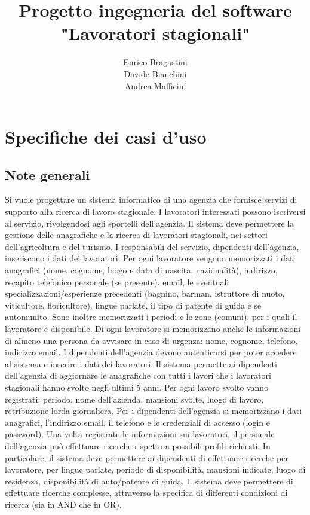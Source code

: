 \documentclass[a4paper, oneside, 12pt]{book}
\begin{document}
\frontmatter

\title{Progetto ingegneria del software \\ "Lavoratori stagionali"}
\author{Enrico Bragastini \\ Davide Bianchini \\ Andrea Mafficini}
\maketitle

\tableofcontents

\chapter{Specifiche dei casi d'uso}

\section{Note generali}
Si vuole progettare un sistema informatico di una agenzia che fornisce servizi di supporto alla ricerca
di lavoro stagionale. I lavoratori interessati possono iscriversi al servizio, rivolgendosi agli sportelli
dell’agenzia. Il sistema deve permettere la gestione delle anagrafiche e la ricerca di lavoratori
stagionali, nei settori dell’agricoltura e del turismo.
I responsabili del servizio, dipendenti dell’agenzia, inseriscono i dati dei lavoratori. Per ogni
lavoratore vengono memorizzati i dati anagrafici (nome, cognome, luogo e data di nascita,
nazionalità), indirizzo, recapito telefonico personale (se presente), email, le eventuali
specializzazioni/esperienze precedenti (bagnino, barman, istruttore di nuoto, viticultore,
floricultore), lingue parlate, il tipo di patente di guida e se automunito. Sono inoltre memorizzati i
periodi e le zone (comuni), per i quali il lavoratore è disponibile. Di ogni lavoratore si memorizzano
anche le informazioni di almeno una persona da avvisare in caso di urgenza: nome, cognome,
telefono, indirizzo email.
I dipendenti dell’agenzia devono autenticarsi per poter accedere al sistema e inserire i dati dei
lavoratori. Il sistema permette ai dipendenti dell’agenzia di aggiornare le anagrafiche con tutti i
lavori che i lavoratori stagionali hanno svolto negli ultimi 5 anni. Per ogni lavoro svolto vanno
registrati: periodo, nome dell’azienda, mansioni svolte, luogo di lavoro, retribuzione lorda
giornaliera. Per i dipendenti dell’agenzia si memorizzano i dati anagrafici, l’indirizzo email, il telefono
e le credenziali di accesso (login e password).
Una volta registrate le informazioni sui lavoratori, il personale dell’agenzia può effettuare ricerche
rispetto a possibili profili richiesti.
In particolare, il sistema deve permettere ai dipendenti di effettuare ricerche per lavoratore, per
lingue parlate, periodo di disponibilità, mansioni indicate, luogo di residenza, disponibilità di
auto/patente di guida. Il sistema deve permettere di effettuare ricerche complesse, attraverso la
specifica di differenti condizioni di ricerca (sia in AND che in OR).
\end{document}

